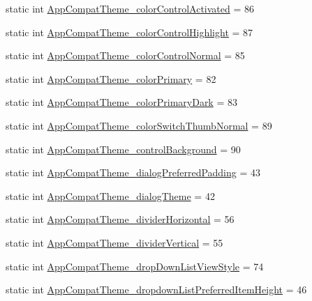 \begin{DoxyCompactItemize}
\item 
static int \hyperlink{classandroid_1_1support_1_1design_1_1R_1_1styleable_af7ed613c3f87592a89ab7e391abb7b7d}{App\+Compat\+Theme\+\_\+color\+Control\+Activated} = 86
\item 
static int \hyperlink{classandroid_1_1support_1_1design_1_1R_1_1styleable_a08a5b7e63a775cd41fec28def9a2e28f}{App\+Compat\+Theme\+\_\+color\+Control\+Highlight} = 87
\item 
static int \hyperlink{classandroid_1_1support_1_1design_1_1R_1_1styleable_acb676a1a9b146706ffe3ae4186403c10}{App\+Compat\+Theme\+\_\+color\+Control\+Normal} = 85
\item 
static int \hyperlink{classandroid_1_1support_1_1design_1_1R_1_1styleable_acffdce3af4b9cdfe390c502719236f7e}{App\+Compat\+Theme\+\_\+color\+Primary} = 82
\item 
static int \hyperlink{classandroid_1_1support_1_1design_1_1R_1_1styleable_a14ae278c8d0811cc9be02dcb6df531a3}{App\+Compat\+Theme\+\_\+color\+Primary\+Dark} = 83
\item 
static int \hyperlink{classandroid_1_1support_1_1design_1_1R_1_1styleable_a70a2af057154b1ea10f13cd045700a22}{App\+Compat\+Theme\+\_\+color\+Switch\+Thumb\+Normal} = 89
\item 
static int \hyperlink{classandroid_1_1support_1_1design_1_1R_1_1styleable_aea175cd3ba91e27d8d492e92dd519ac9}{App\+Compat\+Theme\+\_\+control\+Background} = 90
\item 
static int \hyperlink{classandroid_1_1support_1_1design_1_1R_1_1styleable_a404189687f7f202b9ed1a661ce3ac355}{App\+Compat\+Theme\+\_\+dialog\+Preferred\+Padding} = 43
\item 
static int \hyperlink{classandroid_1_1support_1_1design_1_1R_1_1styleable_af6160d10b114a6eb6ee2f89975605153}{App\+Compat\+Theme\+\_\+dialog\+Theme} = 42
\item 
static int \hyperlink{classandroid_1_1support_1_1design_1_1R_1_1styleable_a5366d4aaeb8ade180e8f192c8c58366f}{App\+Compat\+Theme\+\_\+divider\+Horizontal} = 56
\item 
static int \hyperlink{classandroid_1_1support_1_1design_1_1R_1_1styleable_a8a5a682e061f30c7bd82fc522c70f245}{App\+Compat\+Theme\+\_\+divider\+Vertical} = 55
\item 
static int \hyperlink{classandroid_1_1support_1_1design_1_1R_1_1styleable_aef3b0acbfc00c4f336874396809841c3}{App\+Compat\+Theme\+\_\+drop\+Down\+List\+View\+Style} = 74
\item 
static int \hyperlink{classandroid_1_1support_1_1design_1_1R_1_1styleable_a2bcc01dd4cd3ad74d4af832f4d79af52}{App\+Compat\+Theme\+\_\+dropdown\+List\+Preferred\+Item\+Height} = 46

\end{DoxyCompactItemize}
